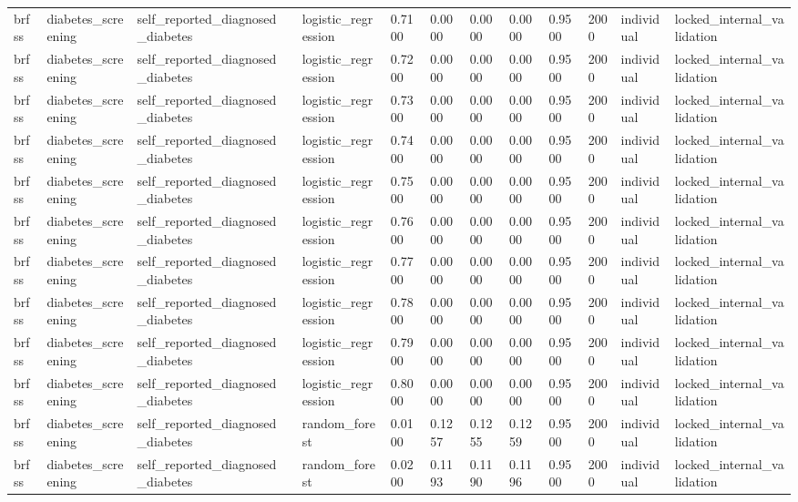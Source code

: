 \begin{tabular}{lllllllllllll}
brfss & diabetes\_screening & self\_reported\_diagnosed\_diabetes &  & logistic\_regression & 0.7100 & 0.0000 & 0.0000 & 0.0000 & 0.9500 & 2000 & individual & locked\_internal\_validation \\
brfss & diabetes\_screening & self\_reported\_diagnosed\_diabetes &  & logistic\_regression & 0.7200 & 0.0000 & 0.0000 & 0.0000 & 0.9500 & 2000 & individual & locked\_internal\_validation \\
brfss & diabetes\_screening & self\_reported\_diagnosed\_diabetes &  & logistic\_regression & 0.7300 & 0.0000 & 0.0000 & 0.0000 & 0.9500 & 2000 & individual & locked\_internal\_validation \\
brfss & diabetes\_screening & self\_reported\_diagnosed\_diabetes &  & logistic\_regression & 0.7400 & 0.0000 & 0.0000 & 0.0000 & 0.9500 & 2000 & individual & locked\_internal\_validation \\
brfss & diabetes\_screening & self\_reported\_diagnosed\_diabetes &  & logistic\_regression & 0.7500 & 0.0000 & 0.0000 & 0.0000 & 0.9500 & 2000 & individual & locked\_internal\_validation \\
brfss & diabetes\_screening & self\_reported\_diagnosed\_diabetes &  & logistic\_regression & 0.7600 & 0.0000 & 0.0000 & 0.0000 & 0.9500 & 2000 & individual & locked\_internal\_validation \\
brfss & diabetes\_screening & self\_reported\_diagnosed\_diabetes &  & logistic\_regression & 0.7700 & 0.0000 & 0.0000 & 0.0000 & 0.9500 & 2000 & individual & locked\_internal\_validation \\
brfss & diabetes\_screening & self\_reported\_diagnosed\_diabetes &  & logistic\_regression & 0.7800 & 0.0000 & 0.0000 & 0.0000 & 0.9500 & 2000 & individual & locked\_internal\_validation \\
brfss & diabetes\_screening & self\_reported\_diagnosed\_diabetes &  & logistic\_regression & 0.7900 & 0.0000 & 0.0000 & 0.0000 & 0.9500 & 2000 & individual & locked\_internal\_validation \\
brfss & diabetes\_screening & self\_reported\_diagnosed\_diabetes &  & logistic\_regression & 0.8000 & 0.0000 & 0.0000 & 0.0000 & 0.9500 & 2000 & individual & locked\_internal\_validation \\
brfss & diabetes\_screening & self\_reported\_diagnosed\_diabetes &  & random\_forest & 0.0100 & 0.1257 & 0.1255 & 0.1259 & 0.9500 & 2000 & individual & locked\_internal\_validation \\
brfss & diabetes\_screening & self\_reported\_diagnosed\_diabetes &  & random\_forest & 0.0200 & 0.1193 & 0.1190 & 0.1196 & 0.9500 & 2000 & individual & locked\_internal\_validation \\

\end{tabular}
